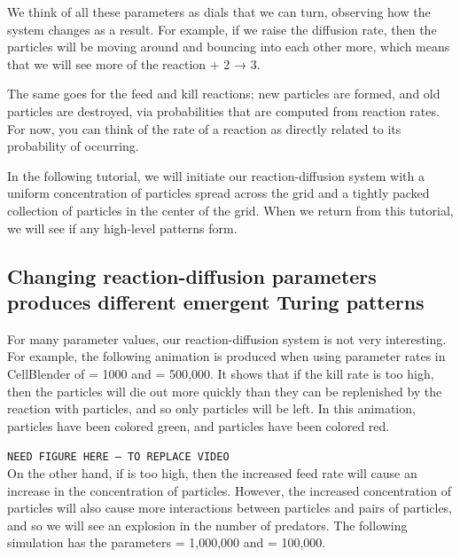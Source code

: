 {We think of all these parameters as dials that we can turn, observing how the system changes as a result. For example, if we raise the diffusion rate, then the particles will be moving around and bouncing into each other more, which means that we will see more of the reaction  + 2 → 3.

\begin{qbox}\end{qbox}

The same goes for the feed and kill reactions; new  particles are formed, and old  particles are destroyed, via probabilities that are computed from reaction rates. For now, you can think of the rate of a reaction as directly related to its probability of occurring.

In the following tutorial, we will initiate our reaction-diffusion system with a uniform concentration of  particles spread across the grid and a tightly packed collection of  particles in the center of the grid. When we return from this tutorial, we will see if any high-level patterns form.


\FloatBarrier
{}
\subsection{Changing reaction-diffusion parameters produces different emergent Turing patterns}

For many parameter values, our reaction-diffusion system is not very interesting.  For example, the following animation is produced when using parameter rates in CellBlender of  = 1000 and  = 500,000.  It shows that if the kill rate is too high, then the  particles will die out more quickly than they can be replenished by the reaction with  particles, and so only  particles will be left. In this animation,  particles have been colored green, and  particles have been colored red.

\texttt{NEED FIGURE HERE -- TO REPLACE VIDEO}\\

On the other hand, if  is too high, then the increased feed rate will cause an increase in the concentration of  particles. However, the increased concentration of  particles will also cause more interactions between  particles and pairs of  particles, and so we will see an explosion in the number of predators. The following simulation has the parameters  = 1,000,000 and  = 100,000.

}
